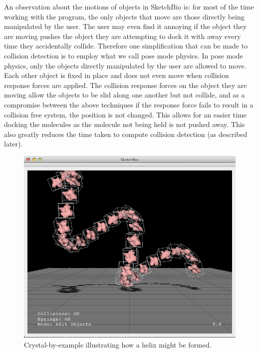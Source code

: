\documentclass[twocolumn]{bmcart}%
\begin{document}
An observation about the motions of objects in SketchBio is: for most of the time working with the program, the only objects that move are those directly being manipulated by the user.
The user may even find it annoying if the object they are moving pushes the object they are attempting to dock it with away every time they accidentally collide.
Therefore one simplification that can be made to collision detection is to employ what we call pose mode physics.
In pose mode physics, only the objects directly manipulated by the user are allowed to move.
Each other object is fixed in place and does not even move when collision response forces are applied.
The collision response forces on the object they are moving allow the objects to be slid along one another but not collide, and as a compromise between the above techniques if the response force fails to result in a collision free system, the position is not changed.
This allows for an easier time docking the molecules as the molecule not being held is not pushed away.
This also greatly reduces the time taken to compute collision detection (as described later).

\begin{figure}[h]
\centering
\includegraphics[width=0.9\columnwidth]{crystalByExample.png}
\caption{Crystal-by-example illustrating how a helix might be formed.}
\label{fig:crystal_by_example}
\end{figure}
\end{document}
